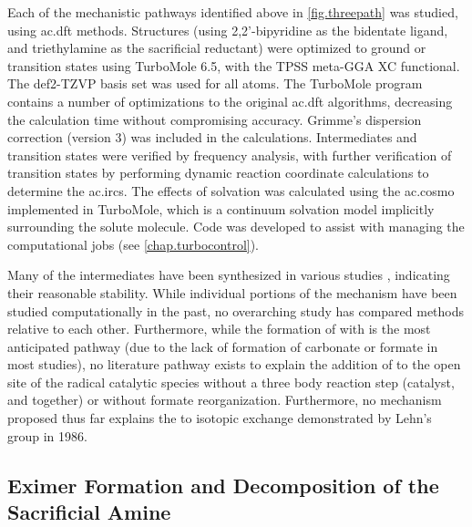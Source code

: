 Each of the mechanistic pathways identified above in \autoref{fig.threepath} was studied, using \gls{ac.dft} methods. Structures (using 2,2'-bipyridine as the bidentate ligand, and triethylamine as the sacrificial reductant) were optimized to ground or transition states using TurboMole 6.5\autocite{turbomole, ahlrichs1989}, with the TPSS meta-GGA XC functional\autocite{tao2003}. The def2-TZVP basis set was used for all atoms\autocite{schafer1994, weigend2005}. The TurboMole program contains a number of optimizations to the original \gls{ac.dft} algorithms\autocite{haase1993, treutler1995, eichkorn1997, eichkorn1995, sierka2003, deglmann2004, weigend2002, vonarnim1998, ahlrichs2004}, decreasing the calculation time without compromising accuracy. Grimme's dispersion correction (version 3) was included in the calculations\autocite{grimme2010}. Intermediates and transition states were verified by frequency analysis\autocite{deglmann2004, deglmann2002, grimme2002}, with further verification of transition states by performing dynamic reaction coordinate calculations to determine the \glspl{ac.irc}. The effects of solvation was calculated using the \gls{ac.cosmo} implemented in TurboMole\autocite{klamt1993}, which is a continuum solvation model implicitly surrounding the solute molecule. Code was developed to assist with managing the computational jobs (see \autoref{chap.turbocontrol}).

Many of the intermediates have been synthesized in various studies \autocite{shaver1992, gibson1998, gibson1999, gibson2003}, indicating their reasonable stability. While individual portions of the mechanism have been studied computationally in the past\autocite{agarwal2011, agarwal2012a, agarwal2012b}, no overarching study has compared methods relative to each other. Furthermore, while the formation of  with  is the most anticipated pathway (due to the lack of formation of carbonate or formate in most studies), no literature pathway exists to explain the addition of  to the open site of the radical catalytic species without a three body reaction step (catalyst,  and  together) or without formate reorganization. Furthermore, no mechanism proposed thus far explains the  to  isotopic exchange demonstrated by Lehn's group in 1986\autocite{hawecker1986}. 

\subsection{Eximer Formation and Decomposition of the Sacrificial Amine}\label{ss.initiation}

